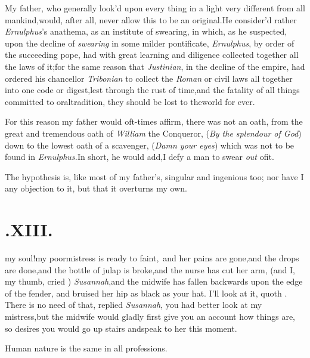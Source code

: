 \documentclass{article}
\begin{document}
My father, who generally look’d upon every thing in a
light very different from all mankind,\tsh would, after all, never
allow this to be an original.\tsh He consider’d rather
\textit{Ernulphus}’s anathema, as an institute of swearing, in
which, as he suspected, upon the decline of \textit{swearing} in some
milder pontificate, \textit{Ernulphus}, by order of the succeeding
pope, had with great learning and diligence collected together all
the laws of it;\tsk for the same reason that \textit{Justinian}, in
the decline of the empire, had ordered his chancellor
\textit{Tri\-bonian} to collect the \textit{Roman} or civil laws all
together into one code or digest,\tsh lest through the
rust of time,\tsk and the fatality of all things committed
to oral\break tradition, they should be lost to the\break world for
ever.

For this reason my father would oft-times affirm, there was not
an oath, from the great and tremendous oath of \textit{William} the
Conqueror, (\textit{By the splendour of God}) down to the lowest oath of a
scavenger, (\textit{Damn your eyes}) which was not to be found in
\textit{Ernulphus.}\tsh In short, he would add,\tsk I defy a man
to swear \textit{out} of\break it.

The hypothesis is, like most of my\break
father’s, singular and ingenious too;\tsh\break
nor have I any objection to it, but that\break
it overturns my own.

\null
\section{.\quad  XIII.}

 my soul!\tsh my
poor\break mistress is ready to faint,\tsh\
and her pains are gone,\tsk and the drops are done,\tsk and the bottle of julap is
broke,\tsh and the nurse has cut her arm,\break
\tsh (and I, my thumb, cried \drslop)
\textit{Susannah},\tsk and the midwife has fallen
backwards upon the edge of the fender, 
and bruised her hip as black as your hat.
\tsh I’ll look at it, quoth \drslop.\tsh\break
There is no need of that, replied \textit{Susannah},\tsk 
you had better look at my mistress,\tsk but
the midwife would gladly first give you an account how things are, so
desires you would go up stairs and\break speak to her this moment.

Human nature is the same in all professions.
\end{document}
